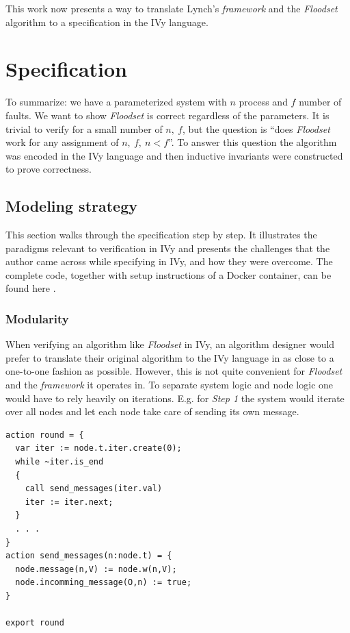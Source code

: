 \documentclass[fleqn]{article}
\begin{document}
This work now presents a way to translate Lynch's \textit{framework} and the \textit{Floodset} algorithm to a specification in the IVy language.

\section{Specification}
To summarize: we have a parameterized system with $n$ process and $f$ number of faults. We want to show \textit{Floodset} is correct regardless of the parameters.
It is trivial to verify for a small number of $n,\ f$, but the question is ``does \textit{Floodset} work for any assignment of $n,\ f,\ n < f$''.
To answer this question the algorithm was encoded in the IVy language and then inductive invariants were constructed to prove correctness.


\subsection{Modeling strategy}

This section walks through the specification step by step. It illustrates the paradigms relevant to verification in IVy and presents the challenges that the author came across while specifying in IVy, and how they were overcome. The complete code, together with setup instructions of a Docker container, can be found here \cite{github}.

\subsubsection{Modularity}
When verifying an algorithm like \textit{Floodset} in IVy, an algorithm designer would prefer to translate their original algorithm to the IVy language in as close to a one-to-one fashion as possible. However, this is not quite convenient for \textit{Floodset} and the \textit{framework} it operates in.
To separate system logic and node logic one would have to rely heavily on iterations. E.g. for \textit{Step 1} the system would iterate over all nodes and let each node take care of sending its own message.

\begin{mdframed}[nobreak=true, backgroundcolor=light-gray, roundcorner=10pt,leftmargin=1, rightmargin=1, innerleftmargin=15, innertopmargin=15,innerbottommargin=15, outerlinewidth=1, linecolor=light-gray]
\begin{lstlisting}
action round = {
  var iter := node.t.iter.create(0);
  while ~iter.is_end
  {
    call send_messages(iter.val)
    iter := iter.next;
  }
  . . .
}
action send_messages(n:node.t) = {
  node.message(n,V) := node.w(n,V);
  node.incomming_message(O,n) := true;
}

export round
\end{lstlisting}
\end{mdframed}
\end{document}
